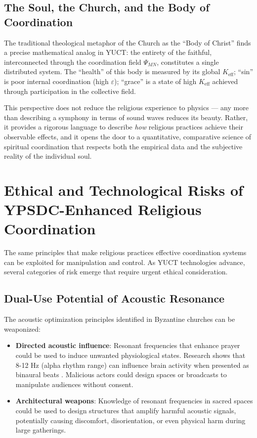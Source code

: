 \documentclass[12pt,a4paper]{article}
\begin{document}
	\subsection{The Soul, the Church, and the Body of Coordination}
	
	The traditional theological metaphor of the Church as the ``Body of Christ'' finds a precise mathematical analog in YUCT: the entirety of the faithful, interconnected through the coordination field \(\Psi_{MN}\), constitutes a single distributed system. The ``health'' of this body is measured by its global \(K_{\mathrm{eff}}\); ``sin'' is poor internal coordination (high \(\varepsilon\)); ``grace'' is a state of high \(K_{\mathrm{eff}}\) achieved through participation in the collective field.
	
	This perspective does not reduce the religious experience to physics — any more than describing a symphony in terms of sound waves reduces its beauty. Rather, it provides a rigorous language to describe \emph{how} religious practices achieve their observable effects, and it opens the door to a quantitative, comparative science of spiritual coordination that respects both the empirical data and the subjective reality of the individual soul.
	
	\section{Ethical and Technological Risks of YPSDC-Enhanced Religious Coordination}
	\label{sec:risks}
	
	The same principles that make religious practices effective coordination systems can be exploited for manipulation and control. As YUCT technologies advance, several categories of risk emerge that require urgent ethical consideration.
	
	\subsection{Dual-Use Potential of Acoustic Resonance}
	
	The acoustic optimization principles identified in Byzantine churches can be weaponized:
	
	\begin{itemize}
		\item \textbf{Directed acoustic influence}: Resonant frequencies that enhance prayer could be used to induce unwanted physiological states. Research shows that 8-12 Hz (alpha rhythm range) can influence brain activity when presented as binaural beats \cite{Garcia2021}. Malicious actors could design spaces or broadcasts to manipulate audiences without consent.
		
		\item \textbf{Architectural weapons}: Knowledge of resonant frequencies in sacred spaces could be used to design structures that amplify harmful acoustic signals, potentially causing discomfort, disorientation, or even physical harm during large gatherings.
	\end{itemize}
	
\end{document}
